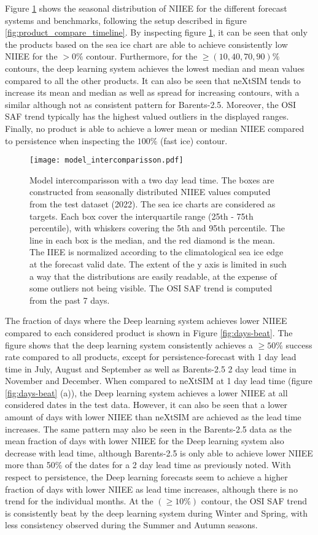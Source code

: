 \documentclass[../main/thesis.tex]{subfiles}
\begin{document}
Figure \ref{fig:model_compare} shows the seasonal distribution of NIIEE for the different forecast systems and benchmarks, following the setup described in figure \ref{fig:product_compare_timeline}. By inspecting figure \ref{fig:model_compare}, it can be seen that only the products based on the sea ice chart are able to achieve consistently low NIIEE for the $>0\%$ contour. Furthermore, for the $\geq(10, 40, 70, 90)\%$ contours, the deep learning system achieves the lowest median and mean values compared to all the other products. It can also be seen that neXtSIM tends to increase its mean and median as well as spread for increasing contours, with a similar although not as consistent pattern for Barents-2.5. Moreover, the OSI SAF trend typically has the highest valued outliers in the displayed ranges. Finally, no product is able to achieve a lower mean or median NIIEE compared to persistence when inspecting the $100\%$ (fast ice) contour. 

\begin{figure}
    \centering
    \texttt{[image: model\_intercomparisson.pdf]}
    \caption{\label{fig:model_compare}Model intercomparisson with a two day lead time. The boxes are constructed from seasonally distributed NIIEE values computed from the test dataset (2022). The sea ice charts are considered as targets. Each box cover the interquartile range (25th - 75th percentile), with whiskers covering the 5th and 95th percentile. The line in each box is the median, and the red diamond is the mean. The IIEE is normalized according to the climatological sea ice edge at the forecast valid date. The extent of the y axis is limited in such a way that the distributions are easily readable, at the expense of some outliers not being visible. The OSI SAF trend is computed from the past 7 days.}
\end{figure}

The fraction of days where the Deep learning system achieves lower NIIEE compared to each considered product is shown in Figure \ref{fig:days-beat}. The figure shows that the deep learning system consistently achieves a $\geq50\%$ success rate compared to all products, except for persistence-forecast with 1 day lead time in July, August and September as well as Barents-2.5 2 day lead time in November and December. When compared to neXtSIM at 1 day lead time (figure \ref{fig:days-beat} (a)), the Deep learning system achieves a lower NIIEE at all considered dates in the test data. However, it can also be seen that a lower amount of days with lower NIIEE than neXtSIM are achieved as the lead time increases. The same pattern may also be seen in the Barents-2.5 data as the mean fraction of days with lower NIIEE for the Deep learning system also decrease with lead time, although Barents-2.5 is only able to achieve lower NIIEE more than 50\% of the dates for a 2 day lead time as previously noted. With respect to persistence, the Deep learning forecasts seem to achieve a higher fraction of days with lower NIIEE as lead time increases, although there is no trend for the individual months. At the $(\geq10\%)$ contour, the OSI SAF trend is consistently beat by the deep learning system during Winter and Spring, with less consistency observed during the Summer and Autumn seasons.
\end{document}
